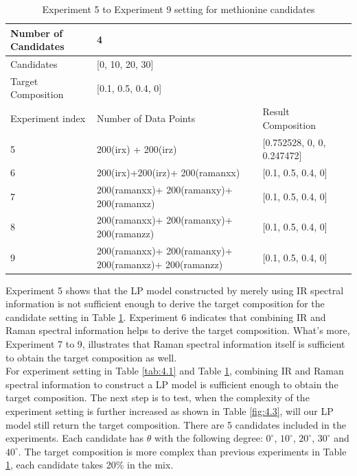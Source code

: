 \begin{table}\tiny \label{tab:4.2}
\begin{center}
\begin{tabular}{| l | l | l | l }
\hline
Number of Candidates & \multicolumn{2}{l|}{4} \\ \hline
Candidates & \multicolumn{2}{l|}{[0, 10, 20, 30]} \\ \hline
Target Composition & \multicolumn{2}{l|}{[0.1, 0.5, 0.4, 0]} \\ \hline
Experiment index & Number of Data Points & Result Composition \\ \hline
5 & 200(irx) + 200(irz) & [0.752528, 0, 0, 0.247472]  \\ \hline
6 & 200(irx)+200(irz)+ 200(ramanxx) & [0.1, 0.5, 0.4, 0] \\ \hline
7 & 200(ramanxx)+ 200(ramanxy)+ 200(ramanxz) & [0.1, 0.5, 0.4, 0] \\ \hline
8 & 200(ramanxx)+ 200(ramanxy)+ 200(ramanzz) & [0.1, 0.5, 0.4, 0] \\ \hline
9 & 200(ramanxx)+ 200(ramanxy)+ 200(ramanxz)+ 200(ramanzz)   & [0.1, 0.5, 0.4, 0] \\ \hline
\end{tabular} 
\end{center}
\caption{Experiment 5 to Experiment 9 setting for methionine candidates}
\end{table}	

Experiment 5 shows that the LP model constructed by merely using IR spectral information is not sufficient enough to derive the target composition for the candidate setting in Table \ref{tab:4.2}. Experiment 6 indicates that combining IR and Raman spectral information helps to derive the target composition. What's more, Experiment 7 to 9, illustrates that Raman spectral information itself is sufficient to obtain the target composition as well. \\

For experiment setting in Table \ref{tab:4.1} and Table \ref{tab:4.2}, combining IR and Raman spectral information to construct a LP model is sufficient enough to obtain the target composition. The next step is to test, when the complexity of the experiment setting is further increased as shown in Table \ref{fig:4.3}, will our LP model still return the target composition. There are 5 candidates included in the experiments. Each candidate has $\theta$ with the following degree: $0^{\circ}$, $10^{\circ}$, $20^{\circ}$, $30^{\circ}$ and $40^{\circ}$. The target composition is more complex than previous experiments in Table \ref{tab:4.2}, each candidate takes 20\% in the mix. \\

